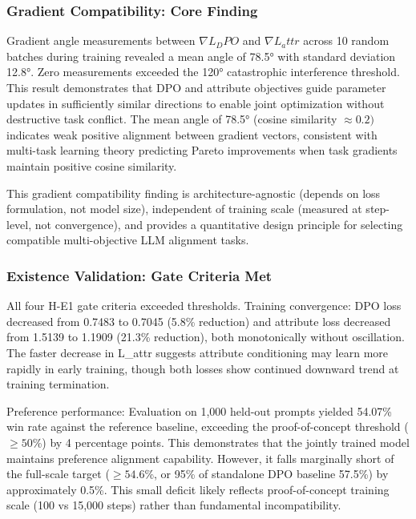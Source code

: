 
\subsubsection{Gradient Compatibility: Core Finding}

Gradient angle measurements between $\nabla L_DPO$ and $\nabla L_attr$ across 10 random batches during training revealed a mean angle of 78.5° with standard deviation 12.8°. Zero measurements exceeded the 120° catastrophic interference threshold. This result demonstrates that DPO and attribute objectives guide parameter updates in sufficiently similar directions to enable joint optimization without destructive task conflict. The mean angle of 78.5° (cosine similarity $\approx 0.2)$ indicates weak positive alignment between gradient vectors, consistent with multi-task learning theory predicting Pareto improvements when task gradients maintain positive cosine similarity.

This gradient compatibility finding is architecture-agnostic (depends on loss formulation, not model size), independent of training scale (measured at step-level, not convergence), and provides a quantitative design principle for selecting compatible multi-objective LLM alignment tasks.

\subsubsection{Existence Validation: Gate Criteria Met}

All four H-E1 gate criteria exceeded thresholds. Training convergence: DPO loss decreased from 0.7483 to 0.7045 (5.8\% reduction) and attribute loss decreased from 1.5139 to 1.1909 (21.3\% reduction), both monotonically without oscillation. The faster decrease in L\_attr suggests attribute conditioning may learn more rapidly in early training, though both losses show continued downward trend at training termination.

Preference performance: Evaluation on 1,000 held-out prompts yielded 54.07\% win rate against the reference baseline, exceeding the proof-of-concept threshold ($\geq 50$\%) by 4 percentage points. This demonstrates that the jointly trained model maintains preference alignment capability. However, it falls marginally short of the full-scale target ($\geq 54.6$\%, or 95\% of standalone DPO baseline 57.5\%) by approximately 0.5\%. This small deficit likely reflects proof-of-concept training scale (100 vs 15,000 steps) rather than fundamental incompatibility.

